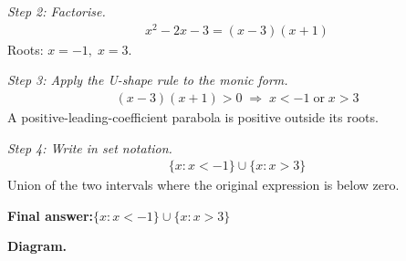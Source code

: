\documentclass[11pt]{article}
\begin{document}
\textit{Step 2: Factorise.}
\[\begin{gathered}
x^2 - 2x - 3 = (x - 3)(x + 1)
\end{gathered}\]
Roots: \( x = -1, \; x = 3 \).

\textit{Step 3: Apply the U-shape rule to the monic form.}
\[\begin{gathered}
(x - 3)(x + 1) > 0 \;\Longrightarrow\; x < -1 \;\text{or}\; x > 3
\end{gathered}\]
A positive-leading-coefficient parabola is positive outside its roots.

\textit{Step 4: Write in set notation.}
\[\begin{gathered}
\{ x : x < -1 \} \cup \{ x : x > 3 \}
\end{gathered}\]
Union of the two intervals where the original expression is below zero.

\begin{answerbox}
\textbf{Final answer:}\quad \(\displaystyle \{ x : x < -1 \} \cup \{ x : x > 3 \}\)
\end{answerbox}
\textbf{Diagram.}
\end{document}

